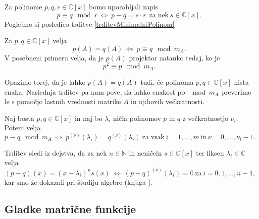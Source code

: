 \documentclass[mat1]{fmfdelo}
\newcommand{\N}{\mathbb N}
\newcommand{\C}{\mathbb C}
\begin{document}
Za polinome $p, q, r \in \C [x]$ bomo uporabljali zapis
\begin{equation*}
    p \equiv q \mod r\  \Longleftrightarrow\  p - q = s\cdot r\ \  \text{za nek}\  s\in \C [x].
\end{equation*}
Poglejmo si posledico trditve \ref{trditevMinimalniPolinom}
\begin{posledica} \label{posledicaProjekcija}
    Za $p, q \in \C [x]$ velja
    \begin{equation*}
        p(A) = q(A)\  \Longleftrightarrow\ p \equiv q \mod m_A.
    \end{equation*}
    V posebnem primeru velja, da je $p(A)$ projektor natanko tedaj, ko je
    \begin{equation*}
        p^2 \equiv p \mod m_A.
    \end{equation*}
\end{posledica}
Opazimo torej, da je lahko $p(A) = q(A)$ tudi, če polinoma $p, q \in \C [x]$ nista enaka. Naslednja trditev pa nam pove, da lahko enakost po $\mod m_A$ preverimo le s pomočjo lastnih vrednosti matrike $A$ in njihovih večkratnosti.
\begin{trditev} \label{trditevPosploseniMinimalni}
    Naj bosta $p, q \in \C [x]$ in naj bo $\lambda_i$ ničla polinomov $p$ in $q$ z večkratnostjo $\nu_i$. Potem velja
    \begin{equation*}
        p \equiv q \mod m_A \ \Longleftrightarrow\  p^{\left(\nu\right)}\left(\lambda_i\right) = q^{\left(\nu\right)}\left(\lambda_i\right)\ \text{za vsak}\ i = 1, \ldots, m\ \text{in}\ \nu = 0, \ldots, \nu_i-1.
    \end{equation*}
\end{trditev}
\begin{dokaz}
    Trditev sledi iz dejstva, da za nek $n\in \N$ in neničeln $s \in \C [x]$ ter fiksen $\lambda_i \in \C$ velja
    \begin{equation*}
        \left(p-q\right)(x) = \left(x-\lambda_i\right)^n s(x) \ \Longleftrightarrow\  \left(p-q\right)^{(\nu)}(\lambda_i)=0 \ \text{za}\  i=0, 1, \ldots, n-1,
    \end{equation*}
    kar smo že dokazali pri študiju algebre (knjiga \cite[poglavje 7.5]{bresar}).
\end{dokaz}

\subsection{Gladke matrične funkcije}
\end{document}
